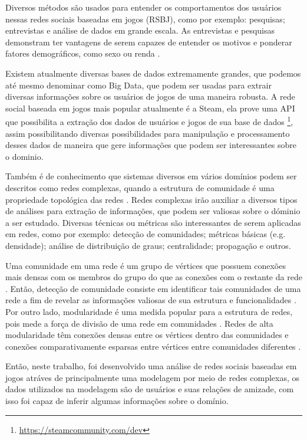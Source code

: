 \documentclass[12pt]{article}
\begin{document}
Diversos métodos são usados para entender os comportamentos dos usuários nessas redes sociais baseadas em jogos (RSBJ), como por exemplo: pesquisas; entrevistas e análise de dados em grande escala. As entrevistas e pesquisas demonstram ter vantagens de serem capazes de entender os motivos e ponderar fatores demográficos, como sexo ou renda \cite{yee2006demographics,yee2006motivations}.

Existem atualmente diversas bases de dados extremamente grandes, que podemos até mesmo denominar como Big Data, que podem ser usadas para extrair diversas informações sobre os usuários de jogos de uma maneira robusta. A rede social baseada em jogos mais popular atualmente é a Steam, ela prove uma API que possibilita a extração dos dados de usuários e jogos de sua base de dados \footnote{\url{https://steamcommunity.com/dev}\label{fn:steamapi}}, assim possibilitando diversas possibilidades para manipulação e processamento desses dados de maneira que gere informações que podem ser interessantes sobre o dominio.

Também é de conhecimento que sistemas diversos em vários domínios podem ser descritos como redes complexas, quando a estrutura de comunidade é uma propriedade topológica das redes \cite{albert2002statistical,radicchi2004defining}. Redes complexas irão auxiliar a diversos tipos de análises para extração de informações, que podem ser valiosas sobre o dóminio a ser estudado. Diversas técnicas ou métricas são interessantes de serem aplicadas em redes, como por exemplo: detecção de comunidades; métricas básicas (e.g. densidade); análise de distribuição de graus; centralidade; propagação e outros.

Uma comunidade em uma rede é um grupo de vértices que possuem conexões mais densas com os membros do grupo do que as conexões com o restante da rede \cite{girvan2002community}. Então, detecção de comunidade consiste em identificar tais comunidades de uma rede a fim de revelar as informações valiosas de sua estrutura e funcionalidades \cite{li2020preliminary}. Por outro lado, modularidade é uma medida popular para a estrutura de redes, pois mede a força de divisão de uma rede em comunidades \cite{newman2006modularity,li2020preliminary}. Redes de alta modularidade têm conexões densas entre os vértices dentro das comunidades e conexões comparativamente esparsas entre vértices entre comunidades diferentes \cite{li2020preliminary}.

Então, neste trabalho, foi desenvolvido uma análise de redes sociais baseadas em jogos atráves de principalmente uma modelagem por meio de redes complexas, os dados utilizados na modelagem são de usuários e suas relações de amizade, com isso foi capaz de inferir algumas informações sobre o domínio.
\end{document}

